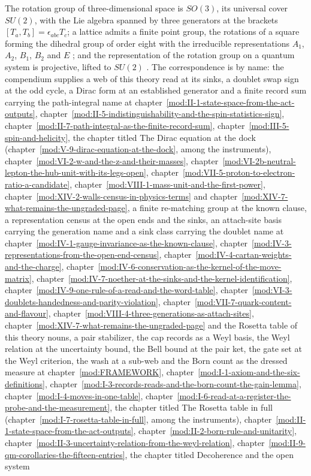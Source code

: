 \begin{chbridge}
The rotation group of three-dimensional space is $SO(3)$, its universal cover $SU(2)$, with the Lie algebra spanned by three generators at the brackets $[T_a, T_b] = \epsilon_{abc} T_c$; a lattice admits a finite point group, the rotations of a square forming the dihedral group of order eight with the irreducible representations $A_1$, $A_2$, $B_1$, $B_2$ and $E$ \cite{Hamermesh1962}; and the representation of the rotation group on a quantum system is projective, lifted to $SU(2)$ \cite{Wigner1959}. The correspondence is by name: the compendium supplies a web of this theory read at its sinks, a doublet swap sign at the odd cycle, a Dirac form at an established generator and a finite record sum carrying the path-integral name at chapter~\ref{mod:II-1-state-space-from-the-act-outputs}, chapter~\ref{mod:II-5-indistinguishability-and-the-spin-statistics-sign}, chapter~\ref{mod:II-7-path-integral-as-the-finite-record-sum}, chapter~\ref{mod:III-5-spin-and-helicity}, the chapter titled The Dirac equation at the dock (chapter~\ref{mod:V-9-dirac-equation-at-the-dock}, among the instruments), chapter~\ref{mod:VI-2-w-and-the-z-and-their-masses}, chapter~\ref{mod:VI-2b-neutral-lepton-the-hub-unit-with-its-legs-open}, chapter~\ref{mod:VII-5-proton-to-electron-ratio-a-candidate}, chapter~\ref{mod:VIII-1-mass-unit-and-the-first-power}, chapter~\ref{mod:XIV-2-walls-census-in-physics-terms} and chapter~\ref{mod:XIV-7-what-remains-the-ungraded-page}, a finite re-matching group at the known clause, a representation census at the open ends and the sinks, an attach-site basis carrying the generation name and a sink class carrying the doublet name at chapter~\ref{mod:IV-1-gauge-invariance-as-the-known-clause}, chapter~\ref{mod:IV-3-representations-from-the-open-end-census}, chapter~\ref{mod:IV-4-cartan-weights-and-the-charge}, chapter~\ref{mod:IV-6-conservation-as-the-kernel-of-the-move-matrix}, chapter~\ref{mod:IV-7-noether-at-the-sinks-and-the-kernel-identification}, chapter~\ref{mod:IV-9-one-rule-of-a-read-and-the-word-table}, chapter~\ref{mod:VI-3-doublets-handedness-and-parity-violation}, chapter~\ref{mod:VII-7-quark-content-and-flavour}, chapter~\ref{mod:VIII-4-three-generations-as-attach-sites}, chapter~\ref{mod:XIV-7-what-remains-the-ungraded-page} and the Rosetta table of this theory nouns, a pair stabilizer, the cap records as a Weyl basis, the Weyl relation at the uncertainty bound, the Bell bound at the pair ket, the gate set at the Weyl criterion, the wash at a sub-web and the Born count as the dressed measure at chapter~\ref{mod:FRAMEWORK}, chapter~\ref{mod:I-1-axiom-and-the-six-definitions}, chapter~\ref{mod:I-3-records-reads-and-the-born-count-the-gain-lemma}, chapter~\ref{mod:I-4-moves-in-one-table}, chapter~\ref{mod:I-6-read-at-a-register-the-probe-and-the-measurement}, the chapter titled The Rosetta table in full (chapter~\ref{mod:I-7-rosetta-table-in-full}, among the instruments), chapter~\ref{mod:II-1-state-space-from-the-act-outputs}, chapter~\ref{mod:II-2-born-rule-and-unitarity}, chapter~\ref{mod:II-3-uncertainty-relation-from-the-weyl-relation}, chapter~\ref{mod:II-9-qm-corollaries-the-fifteen-entries}, the chapter titled Decoherence and the open system 
\end{chbridge}
